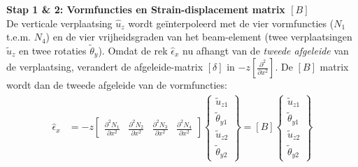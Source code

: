 \documentclass[a4paper,11pt,twoside]{report}
\begin{document}
\textbf{Stap 1 \& 2: Vormfuncties en Strain-displacement matrix $[B]$} \\
De verticale verplaatsing $\hat{u}_z$ wordt geïnterpoleerd met de vier vormfuncties ($N_1$ t.e.m.
$N_4$) en de vier vrijheidsgraden van het beam-element (twee verplaatsingen $\tilde{u}_z$ en twee
rotaties $\tilde{\theta}_y$).
Omdat de rek $\hat{\epsilon}_x$ nu afhangt van de \textit{tweede afgeleide} van de verplaatsing,
verandert de afgeleide-matrix $[\delta]$ in $-z [\frac{\partial^2}{\partial x^2}]$. De $[B]$ matrix
wordt dan de tweede afgeleide van de vormfuncties:
\begin{align*}
    \hat{\epsilon}_x & = -z \begin{bmatrix} \frac{\partial^2 N_1}{\partial x^2} & \frac{\partial^2 N_2}{\partial x^2} & \frac{\partial^2 N_3}{\partial x^2} & \frac{\partial^2 N_4}{\partial x^2} \end{bmatrix} \begin{Bmatrix} \tilde{u}_{z1} \\ \tilde{\theta}_{y1} \\ \tilde{u}_{z2} \\ \tilde{\theta}_{y2} \end{Bmatrix} = [B]\begin{Bmatrix} \tilde{u}_{z1} \\ \tilde{\theta}_{y1} \\ \tilde{u}_{z2} \\ \tilde{\theta}_{y2} \end{Bmatrix}
\end{align*}
\end{document}
